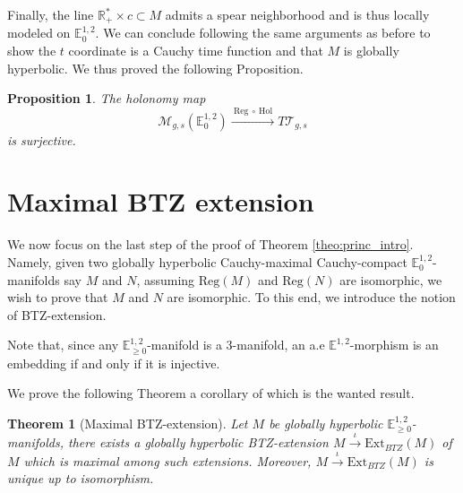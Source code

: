 \documentclass[a4paper,12pt]{article}
\def\M{\mathcal{M}}
\def\T{\mathcal{T}}
\def\RR{\mathbb{R}}
\newcommand{\mass}[1]{{\mathbb E}^{1,2}_{#1}}
\def\Hol{\mathrm{Hol}}
\def\Reg{\mathrm{Reg}}
\def\BTZext{\mathrm{Ext}_{BTZ}}
\def\reg{\Reg}
\newtheorem{theo}{Theorem}    %
\newtheorem{propou}[lemou]{Proposition}
\begin{document}
  Finally, the line $\RR_+^*\times c \subset M$ admits a spear neighborhood and is thus  locally modeled on $\mass{0}$. We can conclude following the same arguments as before to show the $t$ coordinate is a Cauchy time function and that $M$ is globally hyperbolic. We thus proved the following Proposition.



\begin{propou}\label{prop:surjective}
  The holonomy map $$ \M_{g,s}(\mass{0}) \xrightarrow{~\reg~\circ~\Hol~} T\T_{g,s}$$
  is surjective.
\end{propou}





  \section{Maximal BTZ extension} \label{sec:extension_BTZ_2}

  
      We now focus on the last step of the proof of Theorem \ref{theo:princ_intro}. Namely, given two globally hyperbolic Cauchy-maximal Cauchy-compact $\mass{0}$-manifolds say $M$ and $N$, assuming $\reg(M)$ and $\reg(N)$ are isomorphic, we wish to prove that $M$ and $N$  are isomorphic. To this end, we introduce the notion of BTZ-extension.
   
	Note that, since any $\mass{\geq 0}$-manifold is a 3-manifold,  an  a.e $\mass{}$-morphism is an embedding if and only if it is injective.
        
        We prove the following Theorem a corollary of which is the wanted result.
      \setcounter{theo}{1}

      \begin{theo}[Maximal BTZ-extension] Let $M$ be globally hyperbolic $\mass{\geq 0}$-manifolds, there exists a globally hyperbolic BTZ-extension $M \xrightarrow{\iota} \BTZext(M)$ of $M$ which is maximal among such extensions. Moreover, $M\xrightarrow{\iota}  \BTZext(M)$ is unique up to isomorphism.
  
      \end{theo}
       
\end{document}
